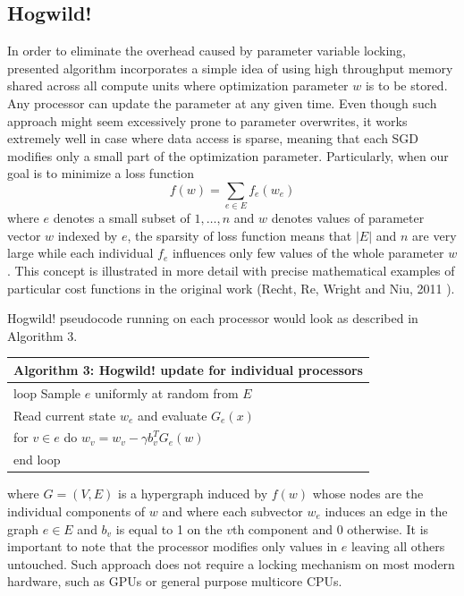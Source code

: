 \subsection{Hogwild!}
In order to eliminate the overhead caused by parameter variable locking, presented algorithm incorporates a simple idea of using high throughput memory shared across all compute units where optimization parameter $w$ is to be stored. Any processor can update the parameter at any given time. Even though such approach might seem excessively prone to parameter overwrites, it works extremely well in case where data access is sparse, meaning that each SGD modifies only a small part of the optimization parameter. Particularly, when our goal is to minimize a loss function
$$f(w)=\sum\limits_{e \in E} f_e(w_e)$$
where $e$ denotes a small subset of ${1, \dots, n}$ and $w$ denotes values of parameter vector $w$ indexed by $e$, the sparsity of loss function means that $|E|$ and $n$ are very large while each individual $f_e$ influences only few values of the whole parameter $w$. This concept is illustrated in more detail with precise mathematical examples of particular cost functions in the original work (Recht, Re, Wright and Niu, 2011 \cite{NIPS2011_4390}).

Hogwild! pseudocode running on each processor would look as described in Algorithm 3.

\begin{table}[h]
	\begin{flushleft}
		\begin{tabular}{l}
			Algorithm 3: Hogwild! update for individual processors\\
			\hline
			loop
			\enskip\enskip Sample $e$ uniformly at random from $E$\\
			\enskip\enskip Read current state $w_e$ and evaluate $G_e(x)$\\
			\enskip\enskip for $v \in e$ do $w_v = w_v - \gamma b^T_v G_e(w)$\\
			end loop\\
		\end{tabular}
	\end{flushleft}
\end{table}

where $G=(V,E)$ is a hypergraph induced by $f(w)$ whose nodes are the individual components of $w$ and where each subvector $w_e$ induces an edge in the graph $e \in E$ and $b_v$ is equal to 1 on the $v$th component and 0 otherwise. It is important to note that the processor modifies only values in $e$ leaving all others untouched.  Such approach does not require a locking mechanism on most modern hardware, such as GPUs or general purpose multicore CPUs.

